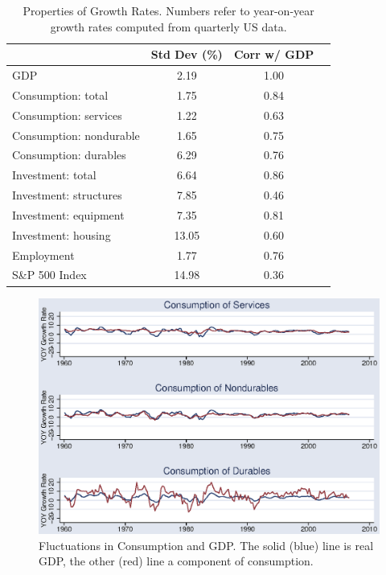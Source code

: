 \documentclass[letterpaper,12pt]{article}
\begin{document}
\begin{table}[h]
\begin{center}
\begin{tabular}{lccc}
\hline
        &  Std Dev (\%)  &  Corr w/ GDP  \\
\hline                 
GDP     &      2.19          &    1.00      \\
Consumption:  total      &  1.75  &  0.84   \\
Consumption:  services   &  1.22  &  0.63   \\
Consumption:  nondurable &  1.65  &  0.75   \\
Consumption:  durables   &  6.29  &  0.76   \\
Investment:  total       &  6.64  &  0.86   \\
Investment:  structures  &  7.85  &  0.46   \\
Investment:  equipment   &  7.35  &  0.81   \\
Investment:  housing     &  13.05\phantom{1} &  0.60   \\
Employment               &  1.77  &  0.76   \\
S\&P 500 Index           &  14.98\phantom{1}  &  0.36   \\
\hline 
\end{tabular}
\caption{Properties of Growth Rates.
Numbers refer to year-on-year growth rates 
computed from quarterly US data.}
\label{tab:cycleprops}
\end{center}
\end{table}


\begin{figure}[h]
    \centering
    \includegraphics[scale=0.8]{usgcall.eps}
    \caption{Fluctuations in Consumption and GDP.
    The solid (blue) line is real GDP, the other (red) line
    a component of consumption.}
    \label{fig:gcall}%
\end{figure}
\end{document}
